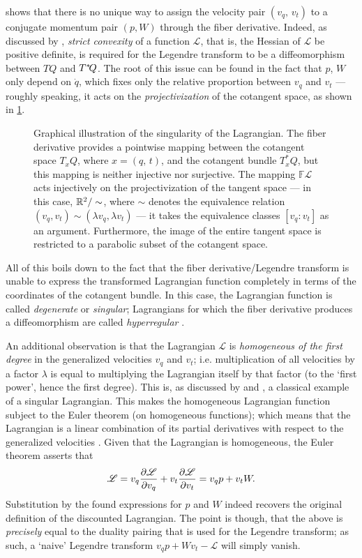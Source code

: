  shows that there is no unique way to assign the velocity pair $(v_q,\,v_t)$ to a conjugate momentum pair $(p, W)$ through the fiber derivative. Indeed, as discussed by \citet[p. 122]{Cannas2001}, \emph{strict convexity} of a function $\mathscr{L}$, that is, the Hessian of $\mathscr{L}$ be positive definite, is required for the Legendre transform to be a diffeomorphism between $TQ$ and $T^*\!Q$. The root of this issue can be found in the fact that $p$, $W$ only depend on $\dot{q}$, which fixes only the relative proportion between $v_q$ and $v_t$ --- roughly speaking, it acts on the \emph{projectivization} of the cotangent space, as shown in \cref{fig:fiber_derivative}.
\begin{figure}[h]
    \centering
    
    \label{fig:fiber_derivative}
    \caption{Graphical illustration of the singularity of the Lagrangian. The fiber derivative provides a pointwise mapping between the cotangent space $T_xQ$, where $x = (q,\,t)$, and the cotangent bundle $T^*_x\!Q$, but this mapping is neither injective nor surjective. The mapping $\mathbb{F}\mathscr{L}$ acts injectively on the projectivization of the tangent space --- in this case, $\mathbb{R}^2 / \sim$, where $\sim$ denotes the equivalence relation $(v_q, v_t) \sim (\lambda v_q, \lambda v_t) $ ---  it takes the equivalence classes $[v_q : v_t]$ as an argument. Furthermore, the image of the entire tangent space is restricted to a parabolic subset of the cotangent space.}
\end{figure}

All of this boils down to the fact that the fiber derivative/Legendre transform is unable to express the transformed Lagrangian function completely in terms of the coordinates of the cotangent bundle. In this case, the Lagrangian function is called \emph{degenerate} or \emph{singular}; Lagrangians for which the fiber derivative produces a diffeomorphism are called \emph{hyperregular} \cite[p. 236]{Abraham1978}.

An additional observation is that the Lagrangian $\mathscr{L}$ is \emph{homogeneous of the first degree} in the generalized velocities $v_q$ and $v_t$; i.e. multiplication of all velocities by a factor $\lambda$ is equal to multiplying the Lagrangian itself by that factor (to the `first power', hence the first degree). This is, as discussed by \citet{Abraham1978} and \citet{Dirac1950}, a classical example of a singular Lagrangian. This makes the homogeneous Lagrangian function subject to the Euler theorem (on homogeneous functions); which means that the Lagrangian is a linear combination of its partial derivatives with respect to the generalized velocities \cite{Dirac1950}. Given that the Lagrangian is homogeneous, the Euler theorem asserts that
$$ \mathscr{L} = v_q \pdv{\mathscr{L}}{v_q} + v_t \pdv{\mathscr{L}}{v_t} = v_q p + v_t W. $$
Substitution by the found expressions for $p$ and $W$ indeed recovers the original definition of the discounted Lagrangian. The point is though, that the above is \emph{precisely} equal to the duality pairing that is used for the Legendre transform; as such, a `naive' Legendre transform $v_q p + Wv_t - \mathscr{L}$ will simply vanish.

